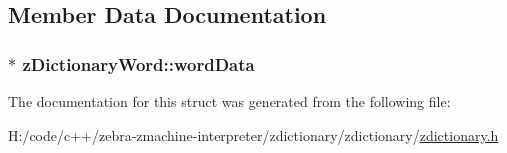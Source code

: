 \subsection{Member Data Documentation}
\hypertarget{structz_dictionary_word_a052383f6650a13c20731dc2e790614ab}{
\subsubsection[{word\-Data}]{$\ast$ z\-Dictionary\-Word\-::word\-Data}}\label{structz_dictionary_word_a052383f6650a13c20731dc2e790614ab}


The documentation for this struct was generated from the following file\-:\begin{DoxyCompactItemize}
\item 
H\-:/code/c++/zebra-\/zmachine-\/interpreter/zdictionary/zdictionary/\hyperlink{zdictionary_8h}{zdictionary.\-h}\end{DoxyCompactItemize}
